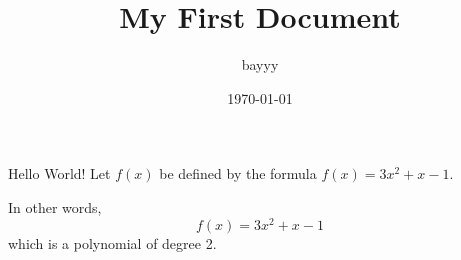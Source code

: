 \documentclass[]{article}	%
\title{My First Document}	%
\author{bayyy}	%
\date{\today}	%
\begin{document}
	\maketitle	%
	
	Hello World!
	Let $f(x)$ be defined by the formula $f(x)=3x^2+x-1$.	%
	
	In other words,
	$$f(x)=3x^2+x-1$$ which is a polynomial of degree 2.	%
\end{document}
